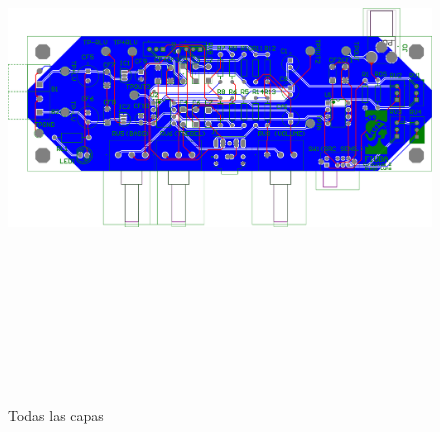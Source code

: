 \clearpage

\begin{figure}[H]
    \centering
    \includegraphics[height=150mm, angle=90]{img/PCB/layers/preamp/all-2D.png}
    \caption{\footnotesize{Todas las capas}}
    \label{fig:pcb_preamp_all}
\end{figure}

\clearpage

